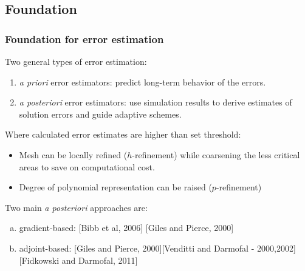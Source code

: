 \documentclass{beamer}
\begin{document}
\subsection{Foundation}
\begin{frame}
\frametitle{Foundation for error estimation}
\scriptsize
Two general types of error estimation:
\begin{enumerate}[1.]
\item \textit{a priori} error estimators:  predict long-term behavior of the errors. 
\item \textit{a posteriori} error estimators: use simulation results to derive estimates of solution errors and guide adaptive schemes.
\end{enumerate}

Where calculated error estimates are higher than set threshold:
\begin{itemize}
\scriptsize
\item Mesh can be locally refined ($h$-refinement) while coarsening the less critical areas to save on computational cost. 
\item Degree of polynomial representation can be raised ($p$-refinement)
\end{itemize}

Two main \textit{a posteriori} approaches are:
\begin{enumerate}[(a)]
\scriptsize
\item gradient-based: [Bibb et al, 2006] [Giles and Pierce, 2000]
\item adjoint-based: [Giles and Pierce, 2000][Venditti and Darmofal - 2000,2002][Fidkowski and Darmofal, 2011] 
\end{enumerate}

\end{frame}
\end{document}
